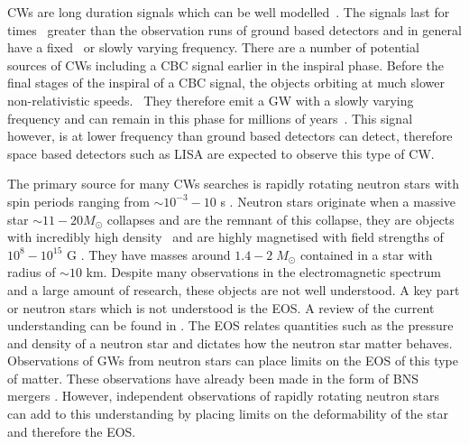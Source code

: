 \glspl{CW} are long duration signals which can be well modelled~.  The signals last for times~ greater than
the observation runs of ground based detectors and in general have a
fixed~ or slowly varying frequency.  There are
a number of potential sources of \glspl{CW} including a \gls{CBC} signal
earlier in the inspiral phase.  Before the final stages of the inspiral of a
\gls{CBC} signal, the objects orbiting at much slower non-relativistic
speeds.~ They therefore emit a
\gls{GW} with a slowly varying frequency and can remain in this phase for
millions of years~.  This signal however, is at lower frequency than
ground based detectors can detect, therefore space based detectors such as
\gls{LISA} \citep{danzmann1996LISALaser} are expected to observe this type of
\gls{CW}.~

The primary source for many \glspl{CW} searches is rapidly rotating neutron
stars with spin periods ranging from $\sim 10^{-3} - 10$ s
\citep{manchester2005AustraliaTelescope}.  Neutron stars originate when a
massive star $\sim 11 - 20 M_{\odot}$ collapses and are the remnant of this
collapse, they are objects with incredibly high density~ and are highly magnetised with field strengths of $10^8 - 10^{15}$
G \citep{konar2017MagneticFields}.  They have masses around $1.4-2 \;
M_{\odot}$ contained in a star with radius of $\sim 10$ km.  Despite many
observations in the electromagnetic spectrum and a large amount of research,
these objects are not well understood.  A key part or neutron stars which is
not understood is the \gls{EOS}. A review of the current understanding can be
found in \cite{lattimer2016EquationState}.  The \gls{EOS} relates quantities
such as the pressure and density of a neutron star and dictates how the neutron
star matter behaves.  Observations of \glspl{GW} from neutron stars can place
limits on the \gls{EOS} of this type of matter.  These observations have
already been made in the form of \gls{BNS} mergers
\citep{abbott2017GW170817Observation}.  However, independent observations of
rapidly rotating neutron stars can add to this understanding by placing limits
on the deformability of the star and therefore the \gls{EOS}.~

